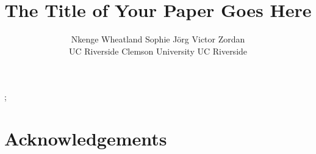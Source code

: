 \documentclass[review]{acmsiggraph}
\title{The Title of Your Paper Goes Here}
\author{Nkenge Wheatland \hspace{10 mm}  
Sophie J\"{o}rg
\hspace{10 mm} 
Victor Zordan 
\\UC Riverside
\hspace{16 mm} Clemson University
\hspace{16 mm} UC Riverside}
\begin{document}

\maketitle

\begin{abstract}


\end{abstract}

\begin{CRcatlist}
  ;
\end{CRcatlist}

\keywordlist

\TOGlinkslist

\copyrightspace












\iffalse
\begin{equation}
 \sum_{j=1}^{z} j = \frac{z(z+1)}{2}
\end{equation}

\begin{eqnarray}
x & \ll & y_{1} + \cdots + y_{n} \\
  & \leq & z
\end{eqnarray}


\begin{figure}[ht]
  \centering
  \texttt{[image: images/samplefigure]}
  \caption{Sample illustration.}
\end{figure}
\fi


\section*{Acknowledgements}



\end{document}
